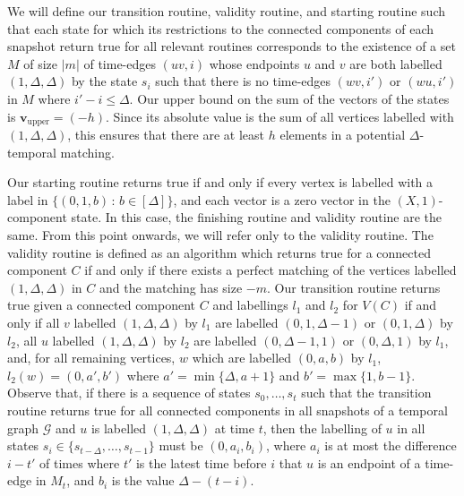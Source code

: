 \documentclass[a4paper,UKenglish,cleveref, autoref, thm-restate]{lipics-v2021} %
\begin{document}
\begin{toappendix}
We will define our transition routine, validity routine, and starting routine such that each state for which its restrictions to the connected components of each snapshot return true for all relevant routines corresponds to the existence of a set $M$ of size $|m|$ of time-edges $(uv,i)$ whose endpoints $u$ and $v$ are both labelled $(1,\Delta,\Delta)$ by the state $s_i$ such that there is no time-edges $(wv,i')$ or $(wu,i')$ in $M$ where $i'-i\leq \Delta$. Our upper bound on the sum of the vectors of the states is $\textbf{v}_{\text{upper}}=(-h)$. Since its absolute value is the sum of all vertices labelled with $(1,\Delta,\Delta)$, this ensures that there are at least $h$ elements in a potential $\Delta$-temporal matching.

Our starting routine returns true if and only if every vertex is labelled with a label in $\{(0,1,b)\,:\, b\in[\Delta]\}$, and each vector is a zero vector in the $(X,1)$-component state. In this case, the finishing routine and validity routine are the same. From this point onwards, we will refer only to the validity routine. The validity routine is defined as an algorithm which returns true for a connected component $C$ if and only if there exists a perfect matching of the vertices labelled $(1,\Delta,\Delta)$ in $C$ and the matching has size $-m$. 
Our transition routine returns true given a connected component $C$ and labellings $l_1$ and $l_2$ for $V(C)$ if and only if all $v$ labelled $(1,\Delta,\Delta)$ by $l_1$ are labelled $(0,1,\Delta-1)$ or $(0,1,\Delta)$ by $l_2$, all $u$ labelled $(1,\Delta,\Delta)$ by $l_2$ are labelled $(0,\Delta-1,1)$ or $(0,\Delta,1)$ by $l_1$, and, for all remaining vertices, $w$ which are labelled $(0,a,b)$ by $l_1$, $l_2(w)=(0,a',b')$ where $a'=\min\{\Delta,a+1\}$ and $b'=\max\{1,b-1\}$. Observe that, if there is a sequence of states $s_0,\ldots,s_t$ such that the transition routine returns true for all connected components in all snapshots of a temporal graph $\mathcal{G}$ and $u$ is labelled $(1,\Delta,\Delta)$ at time $t$, then the labelling of $u$ in all states $s_i\in \{s_{t-\Delta},\ldots,s_{t-1}\}$ must be $(0,a_i,b_i)$, where $a_i$ is at most the difference $i-t'$ of times where $t'$ is the latest time before $i$ that $u$ is an endpoint of a time-edge in $M_t$, and $b_i$ is the value $\Delta-(t-i)$.


\end{toappendix}
\end{document}
